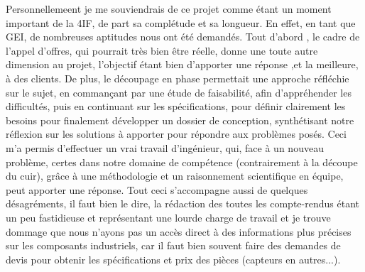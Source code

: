 Personnellemeent je me souviendrais de ce projet comme étant un moment important de la 4IF, de part sa complétude et sa longueur. En effet, en tant que GEI, de nombreuses aptitudes nous ont été demandés.  
Tout d'abord , le cadre de l'appel d'offres, qui pourrait très bien être réelle, donne une toute  autre dimension au projet, l'objectif étant bien d'apporter une réponse ,et la meilleure, à des clients. De plus, le découpage en  phase permettait une approche réfléchie sur le sujet, en commançant par une étude de faisabilité, afin d'appréhender les difficultés, puis en continuant sur les spécifications, pour définir clairement les besoins pour finalement développer un dossier de conception, synthétisant notre réflexion sur les solutions à apporter pour répondre aux problèmes posés.
Ceci m'a permis d'effectuer un vrai travail d'ingénieur, qui, face à un nouveau problème, certes dans notre domaine de compétence (contrairement à la découpe du cuir), grâce à une méthodologie et un raisonnement scientifique en équipe, peut apporter une réponse.
Tout ceci s'accompagne aussi de quelques désagréments, il faut bien le dire, la rédaction des toutes les compte-rendus étant un peu fastidieuse et représentant une lourde charge de travail et je trouve dommage que nous n'ayons pas un accès direct à des informations plus précises sur les composants industriels, car il faut bien souvent faire des demandes de devis pour obtenir les spécifications et prix des pièces (capteurs en autres...).
